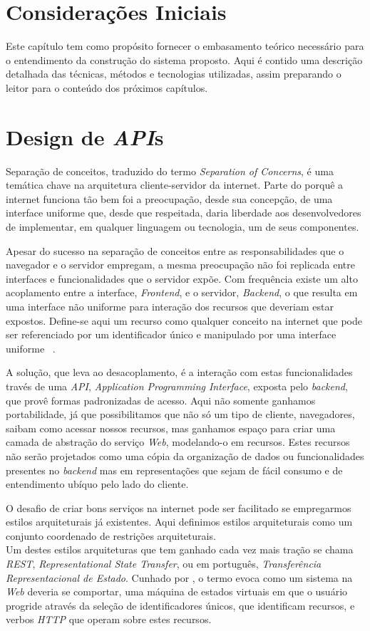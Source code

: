 \section{Considerações Iniciais}
Este capítulo tem como propósito fornecer o embasamento teórico necessário 
para o entendimento da construção do sistema proposto. Aqui é contido uma
descrição detalhada das técnicas, métodos e tecnologias utilizadas, assim  
preparando o leitor para o conteúdo dos próximos capítulos.


\section{Design de \emph{API}s}
Separação de conceitos, traduzido do termo \emph{Separation of Concerns}, é uma temática 
chave na arquitetura cliente-servidor da internet. Parte do porquê a internet funciona tão bem
foi a preocupação, desde sua concepção, de uma interface uniforme que, desde que respeitada, 
 daria liberdade aos desenvolvedores de implementar, em qualquer linguagem ou tecnologia,
 um de seus componentes. 

Apesar do sucesso na separação de conceitos entre as responsabilidades que o navegador 
e o servidor empregam, a mesma preocupação não foi replicada entre interfaces e 
funcionalidades que o servidor expõe. 
Com frequência existe um alto acoplamento entre a interface, \emph{Frontend},
e o servidor, \emph{Backend}, o que resulta em uma interface não uniforme para interação 
dos recursos que deveriam estar expostos. Define-se aqui um recurso como qualquer conceito 
na internet que pode ser referenciado por um identificador único e manipulado por uma interface uniforme 
\ \cite{masse2011rest}.

A solução, que leva ao desacoplamento, é a interação com estas
funcionalidades través de uma \emph{API}, \emph{Application Programming Interface},
exposta pelo \emph{backend}, que provê formas padronizadas 
de acesso. Aqui não somente ganhamos portabilidade, já que possibilitamos que não só 
um tipo de cliente, navegadores, saibam como acessar nossos recursos, mas ganhamos espaço 
para criar uma camada de abstração do serviço \emph{Web}, modelando-o em recursos.
Estes recursos não serão projetados como uma cópia da organização de dados ou funcionalidades 
presentes no \emph{backend} mas em representações que sejam de fácil consumo e de entendimento 
ubíquo pelo lado do cliente.

O desafio de criar bons serviços na internet pode ser facilitado se empregarmos estilos 
arquiteturais já existentes. Aqui definimos estilos arquiteturais como 
um conjunto coordenado de restrições arquiteturais. \\
Um destes estilos arquiteturas que tem ganhado cada vez 
mais tração se chama \emph{REST}, \emph{Representational State Transfer}, ou em português,
\emph{Transferência Representacional de Estado}. Cunhado por , 
o termo evoca como um sistema na \emph{Web} deveria se comportar, uma máquina de estados 
virtuais em que o usuário progride através da seleção de identificadores únicos, que identificam 
recursos, e verbos \emph{HTTP}
que operam sobre estes recursos.

